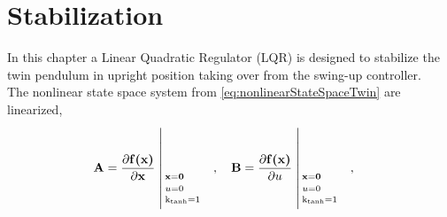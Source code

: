 %
\chapter{Stabilization}
%
%
In this chapter a Linear Quadratic Regulator (LQR) is designed to stabilize the twin pendulum in upright position taking over from the swing-up controller.\\
The nonlinear state space system from \autoref{eq:nonlinearStateSpaceTwin} are linearized,
\begin{align}
  \vec{A} &= \frac{\partial \vec{f(x)}}{\partial \vec{x}} \whereThree{\vec{x}=\vec{0}\ \ \ \ }{u=0\ \ \ \ }{\text{k}_\text{tanh}=1} \ \ \ , \ \ \
  \vec{B} = \frac{\partial \vec{f(x)}}{\partial u}  \whereThree{\vec{x}=\vec{0}\ \ \ \ }{u=0\ \ \ \ }{\text{k}_\text{tanh}=1} \ \ \ ,
  \label{eq:linearTwin_AB}
\end{align}
